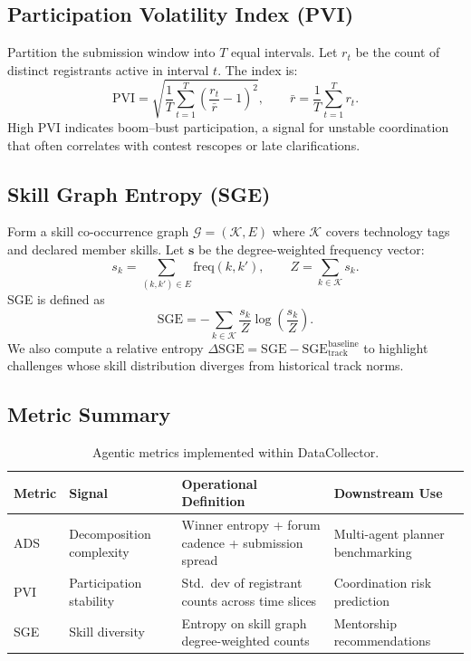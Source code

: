 \documentclass[11pt]{article}
\begin{document}
\subsection{Participation Volatility Index (PVI)}
Partition the submission window into $T$ equal intervals.
Let $r_t$ be the count of distinct registrants active in interval $t$.
The index is:
\[
  \mathrm{PVI} = \sqrt{\frac{1}{T} \sum_{t=1}^{T} \left(\frac{r_t}{\bar{r}} - 1\right)^2}, \qquad \bar{r} = \frac{1}{T}\sum_{t=1}^{T} r_t.
\]
High PVI indicates boom--bust participation, a signal for unstable coordination that often correlates with contest rescopes or late clarifications.

\subsection{Skill Graph Entropy (SGE)}
Form a skill co-occurrence graph $\mathcal{G} = (\mathcal{K}, E)$ where $\mathcal{K}$ covers technology tags and declared member skills.
Let $\mathbf{s}$ be the degree-weighted frequency vector:
\[
  s_k = \sum_{(k, k') \in E} \mathrm{freq}(k, k'), \qquad Z = \sum_{k\in\mathcal{K}} s_k.
\]
SGE is defined as
\[
  \mathrm{SGE} = - \sum_{k \in \mathcal{K}} \frac{s_k}{Z} \log \left(\frac{s_k}{Z}\right).
\]
We also compute a relative entropy $\Delta \mathrm{SGE} = \mathrm{SGE} - \mathrm{SGE}_{\mathrm{track}}^{\mathrm{baseline}}$ to highlight challenges whose skill distribution diverges from historical track norms.

\subsection{Metric Summary}

\begin{table}[h]
\centering
\begin{tabular}{>{\raggedright\arraybackslash}p{3cm} p{3.8cm} p{5.8cm} p{2.8cm}}
\toprule
\textbf{Metric} & \textbf{Signal} & \textbf{Operational Definition} & \textbf{Downstream Use} \\
\midrule
ADS & Decomposition complexity & Winner entropy + forum cadence + submission spread & Multi-agent planner benchmarking \\
PVI & Participation stability & Std.~dev of registrant counts across time slices & Coordination risk prediction \\
SGE & Skill diversity & Entropy on skill graph degree-weighted counts & Mentorship recommendations \\
\bottomrule
\end{tabular}
\caption{Agentic metrics implemented within DataCollector.}
\label{tab:metrics}
\end{table}
\end{document}
